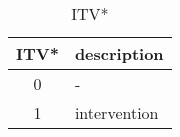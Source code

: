 %
%
\begin{table}[htbp]
\caption{ITV*}\label{tbl:itv}
   \begin{center}
   \begin{tabular}{|c|l|} \hline
      ITV* & description \\ \hline \hline
      0    & - \\ \hline
      1    & intervention \\ \hline
   \end{tabular}
   \end{center}
\end{table}
%
%
